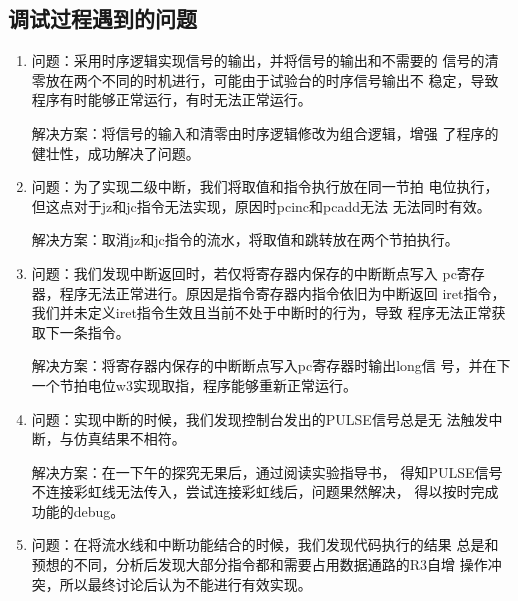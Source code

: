 \subsection{调试过程遇到的问题}
\begin{enumerate}[(1)]
    \item 问题：采用时序逻辑实现信号的输出，并将信号的输出和不需要的
    信号的清零放在两个不同的时机进行，可能由于试验台的时序信号输出不
    稳定，导致程序有时能够正常运行，有时无法正常运行。
    \par 解决方案：将信号的输入和清零由时序逻辑修改为组合逻辑，增强
    了程序的健壮性，成功解决了问题。
    \item 问题：为了实现二级中断，我们将取值和指令执行放在同一节拍
    电位执行，但这点对于jz和jc指令无法实现，原因时pcinc和pcadd无法
    无法同时有效。
    \par 解决方案：取消jz和jc指令的流水，将取值和跳转放在两个节拍执行。
    \item 问题：我们发现中断返回时，若仅将寄存器内保存的中断断点写入
    pc寄存器，程序无法正常进行。原因是指令寄存器内指令依旧为中断返回
    iret指令，我们并未定义iret指令生效且当前不处于中断时的行为，导致
    程序无法正常获取下一条指令。
    \par 解决方案：将寄存器内保存的中断断点写入pc寄存器时输出long信
    号，并在下一个节拍电位w3实现取指，程序能够重新正常运行。
    \item 问题：实现中断的时候，我们发现控制台发出的PULSE信号总是无
    法触发中断，与仿真结果不相符。
    \par 解决方案：在一下午的探究无果后，通过阅读\tec 实验指导书，
    得知PULSE信号不连接彩虹线无法传入，尝试连接彩虹线后，问题果然解决，
    得以按时完成功能的debug。
    \item 问题：在将流水线和中断功能结合的时候，我们发现代码执行的结果
    总是和预想的不同，分析后发现大部分指令都和需要占用数据通路的R3自增
    操作冲突，所以最终讨论后认为不能进行有效实现。
\end{enumerate}
